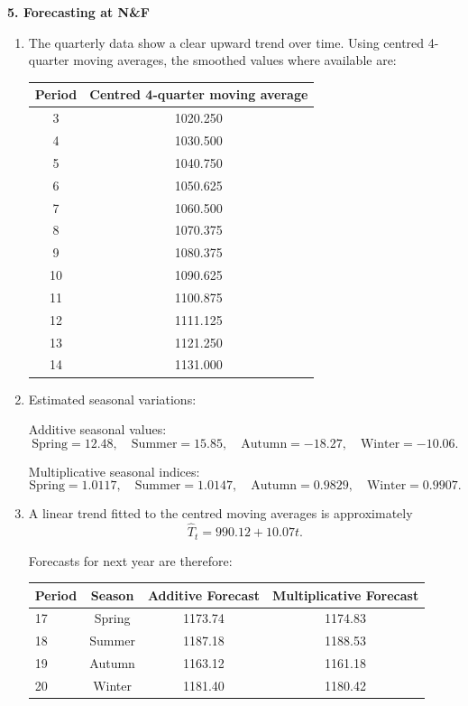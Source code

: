 \documentclass[11pt,a4paper]{article}
\begin{document}
\newpage

\textbf{5. Forecasting at N\&F}

\begin{enumerate}
\item The quarterly data show a clear upward trend over time.
Using centred 4-quarter moving averages, the smoothed values where available are:

\begin{center}
\begin{tabular}{cc}
\toprule
Period & Centred 4-quarter moving average \\
\midrule
3 & 1020.250 \\
4 & 1030.500 \\
5 & 1040.750 \\
6 & 1050.625 \\
7 & 1060.500 \\
8 & 1070.375 \\
9 & 1080.375 \\
10 & 1090.625 \\
11 & 1100.875 \\
12 & 1111.125 \\
13 & 1121.250 \\
14 & 1131.000 \\
\bottomrule
\end{tabular}
\end{center}

\item Estimated seasonal variations:

Additive seasonal values:
\[
\text{Spring}=12.48,\quad
\text{Summer}=15.85,\quad
\text{Autumn}=-18.27,\quad
\text{Winter}=-10.06.
\]

Multiplicative seasonal indices:
\[
\text{Spring}=1.0117,\quad
\text{Summer}=1.0147,\quad
\text{Autumn}=0.9829,\quad
\text{Winter}=0.9907.
\]

\item A linear trend fitted to the centred moving averages is approximately
\[
\hat{T}_t = 990.12 + 10.07t.
\]

Forecasts for next year are therefore:

\begin{center}
\begin{tabular}{lccc}
\toprule
Period & Season & Additive Forecast & Multiplicative Forecast \\
\midrule
17 & Spring & 1173.74 & 1174.83 \\
18 & Summer & 1187.18 & 1188.53 \\
19 & Autumn & 1163.12 & 1161.18 \\
20 & Winter & 1181.40 & 1180.42 \\
\bottomrule
\end{tabular}
\end{center}


\end{enumerate}
\end{document}
